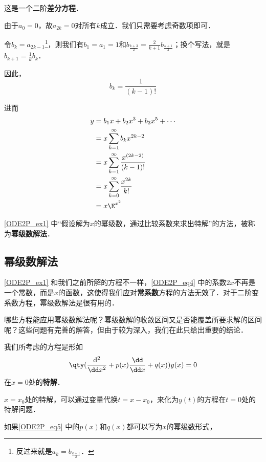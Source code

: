 \begin{example}{}
这是一个二阶\textbf{差分方程}．

由于$a_0=0$，故$a_{2k}=0$对所有$k$成立．我们只需要考虑奇数项即可．

令$b_k=a_{2k-1}$\footnote{反过来就是$a_k=b_{\frac{k+1}{2}}$．}，则我们有$b_1=a_1=1$和$b_{\frac{k+3}{2}}=\frac{2}{k+1}b_{\frac{k+1}{2}}$；换个写法，就是$b_{k+1}=\frac{1}{k}b_k$．

因此，
\begin{equation}
b_k=\frac{1}{(k-1)!}
\end{equation}

进而
\begin{equation}
\begin{aligned}
y&=b_1x+b_2x^3+b_3x^5+\cdots\\
 &=x\sum\limits_{k=1}^\infty b_kx^{2k-2}\\
 &=x\sum\limits_{k=1}^\infty \frac{x^{(2k-2)}}{(k-1)!}\\
 &=x\sum\limits_{k=0}^\infty \frac{x^{2k}}{k!}\\
 &=x\E^{x^2} 
\end{aligned}
\end{equation}

\end{example}

\autoref{ODE2P_ex1} 中“假设解为$x$的幂级数，通过比较系数来求出特解”的方法，被称为\textbf{幂级数解法}．


\subsection{幂级数解法}

\autoref{ODE2P_ex1} 和我们之前所解的方程不一样，\autoref{ODE2P_eq4} 中的系数$2x$不再是一个常数，而是$x$的函数，这使得我们应对\textbf{常系数}方程的方法无效了．对于二阶变系数方程，幂级数解法是很有用的．

哪些方程能应用幂级数解法呢？幂级数解的收敛区间又是否能覆盖所要求解的区间呢？这些问题有完善的解答，但由于较为深入，我们在此只给出重要的结论．

我们所考虑的方程是形如
\begin{equation}\label{ODE2P_eq5}
\qty(\frac{\mathrm{d}^2}{\dd x^2}+p(x)\frac{\dd}{\dd x}+q(x))y(x)=0
\end{equation}
在$x=0$处的\textbf{特解}．

$x=x_0$处的特解，可以通过变量代换$t=x-x_0$，来化为$y(t)$的方程在$t=0$处的特解问题．

\begin{theorem}{}
如果\autoref{ODE2P_eq5} 中的$p(x)$和$q(x)$都可以写为$x$的幂级数形式，
\end{theorem}










